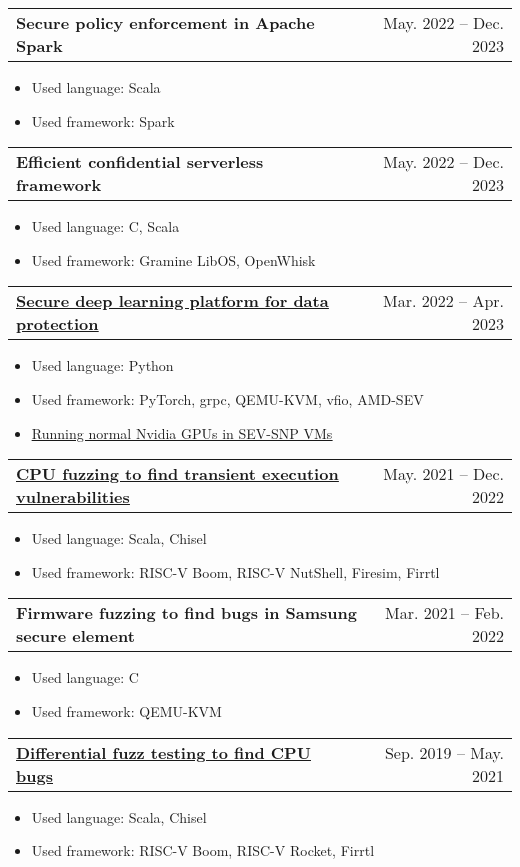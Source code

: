 \documentclass[letterpaper,11pt]{article}
\makeatletter
\newcommand{\resumeItem}[1]{
  \item\small{
    {#1 \vspace{-2pt}}
  }
}
\newcommand{\resumeProjectHeading}[2]{
    \item
    \begin{tabular*}{0.97\textwidth}[t]{l@{\extracolsep{\fill}}r}
      \textbf{#1} & #2
    \end{tabular*}\vspace{-7pt}
}
\newcommand{\resumeItemListStart}{\begin{itemize}}
\newcommand{\resumeItemListEnd}{\end{itemize}\vspace{-5pt}}
\makeatother
\begin{document}
      \resumeProjectHeading
          {\textbf{Secure policy enforcement in Apache Spark}}
          {May. 2022 -- Dec. 2023}

        \resumeItemListStart
            \resumeItem
                {Used language: Scala}
            \resumeItem
                {Used framework: Spark}
        \resumeItemListEnd

      \resumeProjectHeading
          {\textbf{Efficient confidential serverless framework}}
          {May. 2022 -- Dec. 2023}

        \resumeItemListStart
            \resumeItem
                {Used language: C, Scala}
            \resumeItem
                {Used framework: Gramine LibOS, OpenWhisk}
        \resumeItemListEnd

      \resumeProjectHeading
          {\href{https://github.com/JaewonHur/dlbox}{\textbf{\underline{Secure deep learning platform for data protection}}}}
          {Mar. 2022 -- Apr. 2023}

        \resumeItemListStart
            \resumeItem
                {Used language: Python}
            \resumeItem
                {Used framework: PyTorch, grpc, QEMU-KVM, vfio, AMD-SEV}
            \resumeItem
                {\href{https://github.com/JaewonHur/sev-snp-gpu}{\underline{Running normal Nvidia GPUs in SEV-SNP VMs}}}
        \resumeItemListEnd

      \resumeProjectHeading
          {\href{https://github.com/compsec-snu/specdoctor}{\textbf{\underline{CPU fuzzing to find transient execution vulnerabilities}}}}
          {May. 2021 -- Dec. 2022}

        \resumeItemListStart
            \resumeItem
                {Used language: Scala, Chisel}
            \resumeItem
                {Used framework: RISC-V Boom, RISC-V NutShell, Firesim, Firrtl}
        \resumeItemListEnd

      \resumeProjectHeading
          {\textbf{Firmware fuzzing to find bugs in Samsung secure element}}
          {Mar. 2021 -- Feb. 2022}

        \resumeItemListStart
            \resumeItem
                {Used language: C}
            \resumeItem
                {Used framework: QEMU-KVM}
        \resumeItemListEnd


      \resumeProjectHeading
          {\href{https://github.com/compsec-snu/difuzz-rtl}{\textbf{\underline{Differential fuzz testing to find CPU bugs}}}}
          {Sep. 2019 -- May. 2021}

        \resumeItemListStart
            \resumeItem
                {Used language: Scala, Chisel}
            \resumeItem
                {Used framework: RISC-V Boom, RISC-V Rocket, Firrtl}
        \resumeItemListEnd
\end{document}
